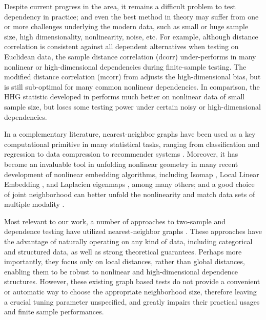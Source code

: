 \documentclass[11pt]{article}
\begin{document}
Despite current progress in the area, it remains a difficult problem to test dependency in practice; and even the best method in theory may suffer from one or more challenges underlying the modern data, such as small or huge sample size, high dimensionality, nonlinearity, noise, etc. For example, although distance correlation is consistent against all dependent alternatives when testing on Euclidean data, the sample distance correlation (dcorr) under-performs in many nonlinear or high-dimensional dependencies during finite-sample testing. The modified distance correlation (mcorr) from \cite{SzekelyRizzo2013a} adjusts the high-dimensional bias, but is still sub-optimal for many common nonlinear dependencies. In comparison, the HHG statistic developed in \cite{HellerGorfine2013} performs much better on nonlinear data of small sample size, but loses some testing power under certain noisy or high-dimensional dependencies. %

In a complementary literature, nearest-neighbor graphs have been used as a key computational primitive in many statistical tasks, ranging from classification and regression \cite{Stone1977} to data compression to recommender systems \cite{Sarwar2000}. Moreover, it has become an invaluable tool in unfolding nonlinear geometry in many recent development of nonlinear embedding algorithms, including Isomap \cite{TenenbaumSilvaLangford2000, SilvaTenenbaum2003}, Local Linear Embedding \cite{SaulRoweis2000, RoweisSaul2003}, and Laplacien eigenmaps \cite{BelkinNiyogi2003}, among many others; and a good choice of joint neighborhood can better unfold the nonlinearity and match data sets of multiple modality \cite{ShenVogelsteinPriebe2016}.

Most relevant to our work, a number of approaches to two-sample and dependence testing have utilized nearest-neighbor graphs \cite{David1966,Friedman1983,Schilling1986,Dumcke2014}.  These approaches have the advantage of naturally operating on any kind of data, including categorical and structured data, as well as strong theoretical guarantees.  Perhaps more importantly, they focus only on local distances, rather than global distances, enabling them to be robust to nonlinear and high-dimensional dependence structures.  However, these existing graph based tests do not provide a convenient or automatic way to choose the appropriate neighborhood size, therefore leaving a crucial tuning parameter unspecified, and greatly impairs their practical usages and finite sample performances. 
\end{document}
